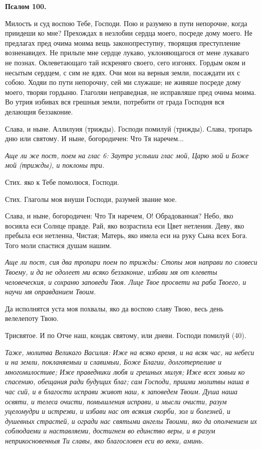 \medskip


\bfseries Псалом 100.\normalfont{}


Милость и суд воспою Тебе, Господи. Пою и разумею в пути непорочне, когда приидеши ко мне? Прехождах в незлобии сердца моего, посреде дому моего. Не предлагах пред очима моима вещь законопреступну, творящия преступление возненавидех. Не прильпе мне сердце лукаво, уклоняющагося от мене лукаваго не познах. Оклеветающаго тай искреняго своего, сего изгонях. Гордым оком и несытым сердцем, с сим не ядях. Очи мои на верныя земли, посаждати их с собою. Ходяи по пути непорочну, сей ми служаше; не живяше посреде дому моего, творяи гордыню. Глаголяи неправедная, не исправляше пред очима моима. Во утрия избивах вся грешныя земли, потребити от града Господня вся делающия беззаконие. 

Слава, и ныне. Аллилуия (трижды). Господи помилуй (трижды). Слава, тропарь дню или святому. И ныне, богородичен: Что Тя наречем...


\itshape Аще ли же пост, поем на глас 6:\normalfont{} Заутра услыши глас мой, Царю мой и Боже мой (трижды), и поклоны три.

Стих. яко к Тебе помолюся, Господи.

Стих. Глаголы моя внуши Господи, разумей звание мое.

Слава, и ныне, богородичен: Что Тя наречем, О! Обрадованная? Небо, яко восияла еси Солнце правде. Рай, яко возрастила еси Цвет нетления. Деву, яко пребыла еси нетленна, Чистая; Матерь, яко имела еси на руку Сына всех Бога. Того моли спастися душам нашим.


\itshape Аще ли пост, сия два тропари поем по трижды:\normalfont{} Стопы моя направи по словеси Твоему, и да не одолеет ми всяко беззаконие, избави мя от клеветы человеческия, и сохраню заповеди Твоя. Лице Твое просвети на раба Твоего, и научи мя оправданием Твоим.

Да исполнятся уста моя похвалы, яко да воспою славу Твою, весь день велелепоту Твою. 

Трисвятое. И по Отче наш, кондак святому, или дневи. Господи помилуй (40).


\itshape Таже, молитва Великаго Василия:\normalfont{} Иже на всяко время, и на всяк час, на небеси и на земли, покланяемыи и славимыи, Боже Благии, долготерпеливе и многомилостиве; Иже праведники любя и грешных милуя; Иже всех зовыи ко спасению, обещания ради будущих благ; сам Господи, приими молитвы наша в час сий, и в благости исправи живот наш, к заповедем Твоим. Душа наша освяти, и телеса очисти, помышления исправи, и мысли очисти, разум уцеломудри и истрезви, и избави нас от всякия скорби, зол и болезней, и душевных страстей, и огради нас святыми ангелы Твоими, яко да ополчением их соблюдаеми и наставляеми, достигнем во единство веры, и в разум неприкосновенныя Ти славы, яко благословен еси во веки, аминь. 

